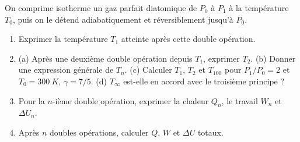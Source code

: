 \documentclass[12pt,a4paper]{article}
\begin{document}
\begin{boiteexercice}
On comprime isotherme un gaz parfait diatomique de $P_0$ à $P_1$ à la température $T_0$, puis on le détend adiabatiquement et réversiblement jusqu'à $P_0$.

\begin{enumerate}
  \item Exprimer la température $T_1$ atteinte après cette double opération.
  \item (a) Après une deuxième double opération depuis $T_1$, exprimer $T_2$. \newline
        (b) Donner une expression générale de $T_n$. \newline
        (c) Calculer $T_1$, $T_2$ et $T_{100}$ pour $P_1/P_0 = 2$ et $T_0 = \qty{300}{K}$, $\gamma = 7/5$. \newline
        (d) $T_\infty$ est-elle en accord avec le troisième principe ?
  \item Pour la $n$-ième double opération, exprimer la chaleur $Q_n$, le travail $W_n$ et $\Delta U_n$.
  \item Après $n$ doubles opérations, calculer $Q$, $W$ et $\Delta U$ totaux.
\end{enumerate}
\end{boiteexercice}
\end{document}
